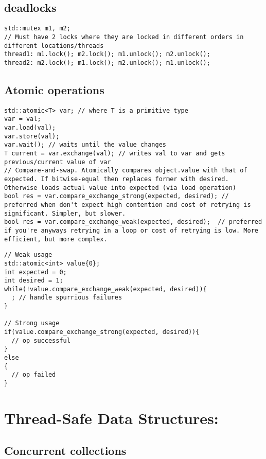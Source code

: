 \documentclass{article}
\begin{document}
    \subsection{ deadlocks}
      \begin{lstlisting}[style=cpp]
std::mutex m1, m2;
// Must have 2 locks where they are locked in different orders in different locations/threads
thread1: m1.lock(); m2.lock(); m1.unlock(); m2.unlock();
thread2: m2.lock(); m1.lock(); m2.unlock(); m1.unlock();
          \end{lstlisting}
    \subsection{ Atomic operations \\}
      \begin{lstlisting}[style=cpp]
std::atomic<T> var; // where T is a primitive type
var = val;
var.load(val);
var.store(val);
var.wait(); // waits until the value changes
T current = var.exchange(val); // writes val to var and gets previous/current value of var
// Compare-and-swap. Atomically compares object.value with that of expected. If bitwise-equal then replaces former with desired. Otherwise loads actual value into expected (via load operation)
bool res = var.compare_exchange_strong(expected, desired); // preferred when don't expect high contention and cost of retrying is significant. Simpler, but slower.
bool res = var.compare_exchange_weak(expected, desired);  // preferred if you're anyways retrying in a loop or cost of retrying is low. More efficient, but more complex.
              \end{lstlisting}
      \begin{lstlisting}[style=cpp]
// Weak usage
std::atomic<int> value{0};
int expected = 0;
int desired = 1;
while(!value.compare_exchange_weak(expected, desired)){
  ; // handle spurrious failures
}

// Strong usage
if(value.compare_exchange_strong(expected, desired)){
  // op successful
}
else
{
  // op failed
}
              \end{lstlisting}

\section{Thread-Safe Data Structures:}
    \subsection{ Concurrent collections}
\end{document}
